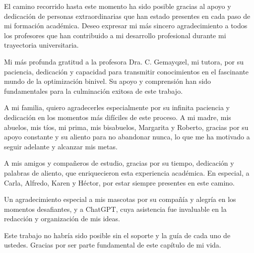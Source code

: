 \begin{acknowledgements}

    \noindent
    El camino recorrido hasta este momento ha sido posible gracias al apoyo y dedicación de personas extraordinarias que han estado presentes en cada paso de mi formación académica. Deseo expresar mi más sincero agradecimiento a todos los profesores que han contribuido a mi desarrollo profesional durante mi trayectoria universitaria.
    
    \vspace{1em}
    
    \noindent
    Mi más profunda gratitud a la profesora Dra. C. Gemayqzel, mi tutora, por su paciencia, dedicación y capacidad para transmitir conocimientos en el fascinante mundo de la optimización binivel. Su apoyo y comprensión han sido fundamentales para la culminación exitosa de este trabajo.
    
    \vspace{1em}
    
    \noindent
    A mi familia, quiero agradecerles especialmente por su infinita paciencia y dedicación en los momentos más difíciles de este proceso. A mi madre, mis abuelos, mis tíos, mi prima, mis bisabuelos, Margarita y Roberto, gracias por su apoyo constante y su aliento para no abandonar nunca, lo que me ha motivado a seguir adelante y alcanzar mis metas.
    
    \vspace{1em}
    
    \noindent
    A mis amigos y compañeros de estudio, gracias por su tiempo, dedicación y palabras de aliento, que enriquecieron esta experiencia académica. En especial, a Carla, Alfredo, Karen y Héctor, por estar siempre presentes en este camino.
    
    \vspace{1em}
    
    \noindent
    Un agradecimiento especial a mis mascotas por su compañía y alegría en los momentos desafiantes, y a ChatGPT, cuya asistencia fue invaluable en la redacción y organización de mis ideas.
    
    \vspace{1em}
    
    \noindent
    Este trabajo no habría sido posible sin el soporte y la guía de cada uno de ustedes. Gracias por ser parte fundamental de este capítulo de mi vida.
    
    \end{acknowledgements}